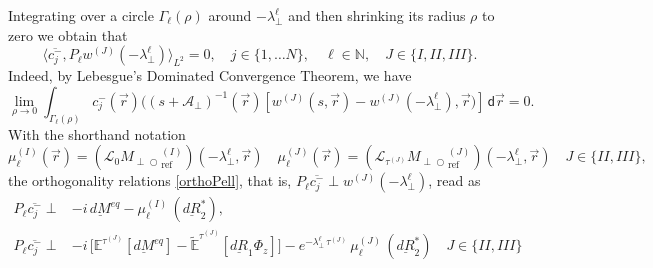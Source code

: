 \documentclass{ws-m3as}
\newcommand{\uld}[1]{\underline{d#1}}
\def\Mpp{M_{\perp\!\!\!\!\!\bigcirc}}
\begin{document}
Integrating over a circle $\Gamma_\ell(\rho)$ around $-\lambda_\perp^\ell$ and then shrinking its radius $\rho$ to zero we
obtain that 
\begin{equation}\label{orthoPell}
\langle \overline{c_j^-}, P_\ell w^{(J)}(-\lambda_\perp^\ell)\rangle_{L^2}=0, 
\quad j\in\{1,\ldots N\}, \quad \ell\in\mathbb{N}, \quad J\in\{I,II,III\}.
\end{equation}
Indeed, by Lebesgue's Dominated Convergence Theorem, we have 
\[
\lim_{\rho\to0} \int_{\Gamma_\ell(\rho)} c^-_j(\vec r) ((s+\mathcal{A}_\perp)^{-1} (\vec r) [w^{(J)}(s,\vec r)-w^{(J)}(-\lambda_\perp^\ell),\vec r)]\,\textsf{d}\vec r =0.
\] 
With the shorthand notation
\[
\mu_\ell^{(I)}(\vec r)=
(\mathcal{L}_0{\Mpp}_{\text{ref}}^{(I)})(-\lambda_\perp^\ell, \vec r)
\quad 
\mu_\ell^{(J)}(\vec r)=
(\mathcal{L}_{\tau^{(J)}}{\Mpp}_{\text{ref}}^{(J)})(-\lambda_\perp^\ell, \vec r)
\quad J\in\{II,III\},
\] 
the orthogonality relations \eqref{orthoPell}, that is, $P_\ell \overline{c_j^-}\perp w^{(J)}(-\lambda_\perp^\ell)$, read as
\begin{equation}\label{Pellcjperp}
\begin{aligned}
P_\ell \overline{c_j^-}\perp&-i\,\uld{M}^{eq}-\mu_\ell^{(I)}\,(\uld{R}_2^*
),\\
P_\ell \overline{c_j^-}\perp&-i\,\bigl[\mathbb{E}^{\tau^{(J)}}[\uld{M}^{eq}]-\widetilde{\mathbb{E}}^{\tau^{(J)}}[\uld{R}_1 \Phi_z]\bigr]
-e^{-\lambda_\perp^\ell\,\tau^{(J)}}\,\mu_\ell^{(J)}\,(\uld{R}_2^*
)\quad J\in\{II,III\}
\end{aligned}
\end{equation}
 
\end{document}
